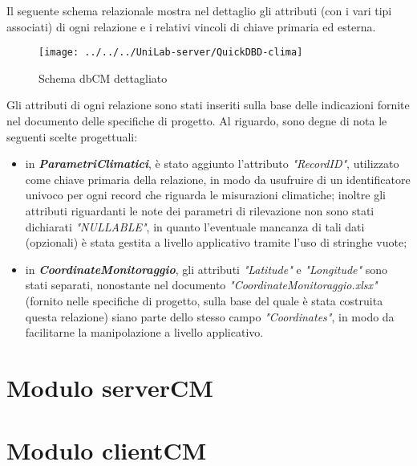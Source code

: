 	Il seguente schema relazionale mostra nel dettaglio gli attributi (con i vari tipi associati) di ogni relazione e i relativi vincoli di chiave primaria ed esterna.
	\begin{figure}[h]
		\centering
		\caption{Schema dbCM dettagliato}
		\label{fig:quickdbd-clima}
		\texttt{[image: ../../../UniLab-server/QuickDBD-clima]}
	\end{figure}
	
	Gli attributi di ogni relazione sono stati inseriti sulla base delle indicazioni fornite nel documento delle specifiche di progetto. Al riguardo, sono degne di nota le seguenti scelte progettuali:
	\begin{itemize}
		\item in \textit{\textbf{ParametriClimatici}}, è stato aggiunto l'attributo \textit{"RecordID"}, utilizzato come chiave primaria della relazione, in modo da usufruire di un identificatore univoco per ogni record che riguarda le misurazioni climatiche; inoltre gli attributi riguardanti le note dei parametri di rilevazione non sono stati dichiarati \textit{"NULLABLE"}, in quanto l'eventuale mancanza di tali dati (opzionali) è stata gestita a livello applicativo tramite l'uso di stringhe vuote;
		\item in \textit{\textbf{CoordinateMonitoraggio}}, gli attributi \textit{"Latitude"} e \textit{"Longitude"} sono stati separati, nonostante nel documento \textit{"CoordinateMonitoraggio.xlsx"} (fornito nelle specifiche di progetto, sulla base del quale è stata costruita questa relazione) siano parte dello stesso campo \textit{"Coordinates"}, in modo da facilitarne la manipolazione a livello applicativo.
	\end{itemize}
	
\chapter{Modulo serverCM}
\chapter{Modulo clientCM}
\nocite{IuriTex}


